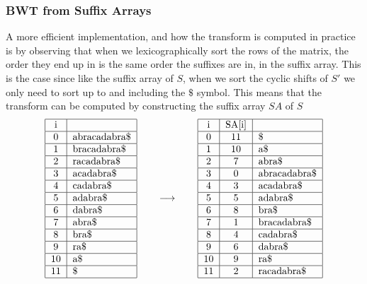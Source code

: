 \documentclass{article}
\begin{document}
\subsubsection{BWT from Suffix Arrays} %
A more efficient implementation, and how the transform is computed in practice is by observing that when we lexicographically sort the rows of the matrix, the order they end up in is the same order the suffixes are in, in the suffix array. This is the case since like the suffix array of \(S\), when we sort the cyclic shifts of \(S'\) we only need to sort up to and including the \(\$\) symbol.
This means that the transform can be computed by constructing the suffix array \(SA\) of \(S\)\cite{manber1993suffix}\cite{simpson2010efficient}
\begin{equation*}
    \begin{tabular}{|c|l|}
    \hline
    i & \\ \hline
    0 & abracadabra\$ \\ \hline
    1 & bracadabra\$ \\ \hline
    2 & racadabra\$ \\ \hline
    3 & acadabra\$ \\ \hline
    4 & cadabra\$ \\ \hline
    5 & adabra\$ \\ \hline
    6 & dabra\$ \\ \hline
    7 & abra\$ \\ \hline
    8 & bra\$ \\ \hline
    9 & ra\$ \\ \hline
    10 & a\$ \\ \hline
    11 &\$ \\ \hline
    \end{tabular}
    \qquad\longrightarrow\qquad
    \begin{tabular}{|c|c|l|}
    \hline
    i & SA[i] & \\ \hline
    0 & 11 &\$ \\ \hline
    1 & 10 & a\$ \\ \hline
    2 & 7 & abra\$ \\ \hline
    3 & 0 & abracadabra\$ \\ \hline
    4 & 3 & acadabra\$ \\ \hline
    5 & 5 & adabra\$ \\ \hline
    
    6 & 8 & bra\$ \\ \hline
    7 & 1 & bracadabra\$ \\ \hline
    8 & 4 & cadabra\$ \\ \hline
    
    9 & 6 & dabra\$ \\ \hline
    10 & 9 & ra\$ \\ \hline
    11 & 2 & racadabra\$ \\ \hline
    \end{tabular}
\end{equation*}
\end{document}

